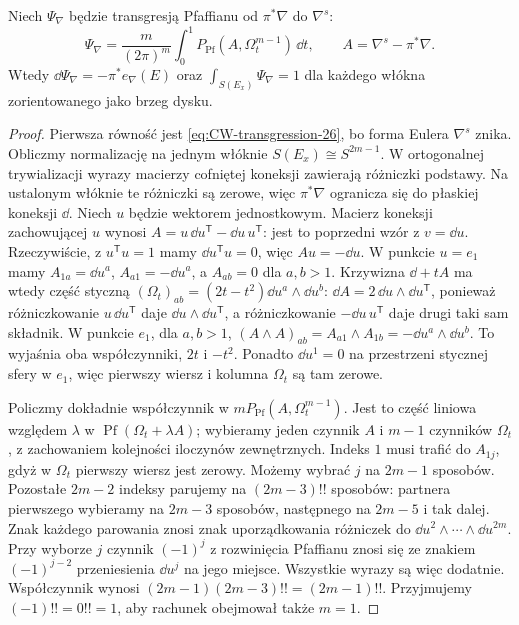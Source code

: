 \begin{lemat}
\label{lem:angular-form-26}
Niech $\Psi_\nabla$ będzie transgresją
Pfaffianu od $\pi^*\nabla$ do $\nabla^s$:
\[
 \Psi_\nabla=
 \frac{m}{(2\pi)^m}\int_0^1
 P_{\operatorname{Pf}}(A,\Omega_t^{m-1})\,\dd t,
 \qquad A=\nabla^s-\pi^*\nabla.
\]
Wtedy
$\dd\Psi_\nabla=-\pi^*e_\nabla(E)$
oraz $\int_{S(E_x)}\Psi_\nabla=1$
dla każdego włókna zorientowanego
jako brzeg dysku.
\end{lemat}
\begin{proof}
Pierwsza równość jest
\eqref{eq:CW-transgression-26},
bo forma Eulera $\nabla^s$ znika.
Obliczmy normalizację na jednym włóknie $S(E_x)\cong S^{2m-1}$.
W ortogonalnej trywializacji wyrazy macierzy
cofniętej koneksji zawierają różniczki podstawy.
Na ustalonym włóknie te różniczki są zerowe,
więc $\pi^*\nabla$ ogranicza się do płaskiej koneksji $\dd$.
Niech $u$ będzie wektorem jednostkowym.
Macierz koneksji zachowującej $u$
wynosi
$A=u\,\dd u^{\mathsf T}-\dd u\,u^{\mathsf T}$:
jest to poprzedni wzór z $v=\dd u$.
Rzeczywiście, z $u^{\mathsf T}u=1$ mamy
$\dd u^{\mathsf T}u=0$, więc $Au=-\dd u$.
W punkcie $u=e_1$ mamy
$A_{1a}=\dd u^a$, $A_{a1}=-\dd u^a$,
a $A_{ab}=0$ dla $a,b>1$.
Krzywizna $\dd+tA$ ma wtedy
część styczną
$(\Omega_t)_{ab}=(2t-t^2)
\dd u^a\wedge\dd u^b$:
$\dd A=2\,\dd u\wedge\dd u^{\mathsf T}$,
ponieważ różniczkowanie $u\,\dd u^{\mathsf T}$ daje
$\dd u\wedge\dd u^{\mathsf T}$,
a różniczkowanie $-\dd u\,u^{\mathsf T}$ daje drugi taki sam składnik.
W punkcie $e_1$, dla $a,b>1$,
$(A\wedge A)_{ab}=A_{a1}\wedge A_{1b}
=-\dd u^a\wedge\dd u^b$.
To wyjaśnia oba współczynniki, $2t$ i $-t^2$.
Ponadto $\dd u^1=0$ na przestrzeni stycznej sfery w $e_1$,
więc pierwszy wiersz i kolumna $\Omega_t$ są tam zerowe.

Policzmy dokładnie współczynnik w
$mP_{\operatorname{Pf}}(A,\Omega_t^{m-1})$.
Jest to część liniowa względem $\lambda$ w
$\operatorname{Pf}(\Omega_t+\lambda A)$;
wybieramy jeden czynnik $A$ i $m-1$ czynników $\Omega_t$,
z zachowaniem kolejności iloczynów zewnętrznych.
Indeks $1$ musi trafić do $A_{1j}$, gdyż w $\Omega_t$
pierwszy wiersz jest zerowy.
Możemy wybrać $j$ na $2m-1$ sposobów.
Pozostałe $2m-2$ indeksy parujemy na
$(2m-3)!!$ sposobów: partnera pierwszego wybieramy
na $2m-3$ sposobów, następnego na $2m-5$ i tak dalej.
Znak każdego parowania znosi znak uporządkowania
różniczek do $\dd u^2\wedge\cdots\wedge\dd u^{2m}$.
Przy wyborze $j$ czynnik $(-1)^j$ z rozwinięcia Pfaffianu
znosi się ze znakiem $(-1)^{j-2}$ przeniesienia $\dd u^j$
na jego miejsce. Wszystkie wyrazy są więc dodatnie.
Współczynnik wynosi $(2m-1)(2m-3)!!=(2m-1)!!$.
Przyjmujemy $(-1)!!=0!!=1$, aby rachunek obejmował także $m=1$.


\end{proof}
